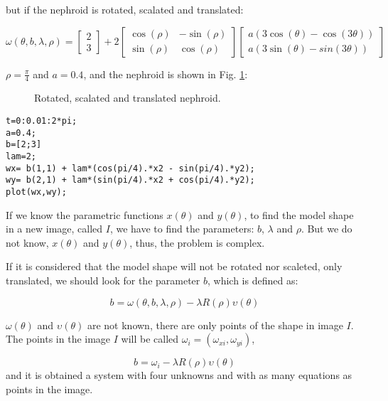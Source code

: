 \documentclass{ws-procs9x6}
\begin{document}
but if the nephroid is rotated, scalated and translated:

$$ \omega(\theta,b,\lambda,\rho) = \begin{bmatrix} 2 \\ 3 \end{bmatrix} + 2 \begin{bmatrix} \cos(\rho) & -\sin(\rho) \\ \sin(\rho) & \cos(\rho) \end{bmatrix} \begin{bmatrix} a(3\cos(\theta) - \cos(3\theta)) \\ a(3\sin(\theta) - sin(3\theta))\end{bmatrix}$$

$\rho=\frac{\pi}{4}$ and $a=0.4$, and the nephroid is shown in
Fig. \ref{fig:nefRot}:

\begin{figure}[h!tpb]
\centering
{}
\caption{Rotated, scalated and translated nephroid.}
\label{fig:nefRot}
\end{figure}

\newpage

\begin{verbatim}
t=0:0.01:2*pi;
a=0.4;
b=[2;3]
lam=2;
wx= b(1,1) + lam*(cos(pi/4).*x2 - sin(pi/4).*y2);
wy= b(2,1) + lam*(sin(pi/4).*x2 + cos(pi/4).*y2);
plot(wx,wy);
\end{verbatim}

If we know the parametric functions $x(\theta)$ and $y(\theta)$, to
find the model shape in a new image, called $I$, we have to find the
parameters: $b$, $\lambda$ and $\rho$. 
But we do not know, $x(\theta)$ and $y(\theta)$, thus, the problem is
complex.

If it is considered that the model shape will not be rotated nor
scaleted, only translated, we should look for the parameter $b$, which
is defined as:

\begin{equation}
b=\omega(\theta,b,\lambda,\rho)-\lambda R(\rho)\upsilon(\theta)
\label{eq:5-73}
\end{equation}

$\omega(\theta)$ and $\upsilon(\theta)$ are not known, there are only
points of the shape in image $I$. The points in the image $I$ will be
called $\omega_{i}=(\omega_{xi},\omega_{yi})$,

$$ b=\omega_{i}-\lambda R(\rho)\upsilon(\theta)$$ 
and it is obtained a system with four unknowns and with as many
equations as points in the image. 
\end{document}
